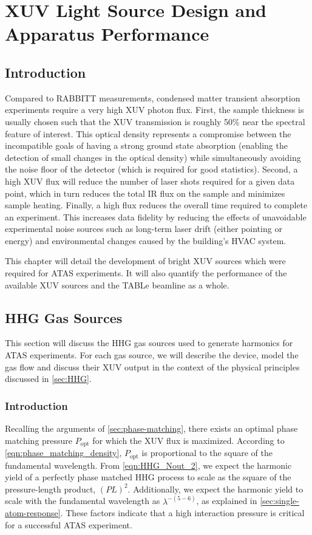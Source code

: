 \chapter{XUV Light Source Design and Apparatus Performance}

\section{Introduction}

Compared to RABBITT measurements, condensed matter transient absorption experiments require a very high XUV photon flux. First, the sample thickness is usually chosen such that the XUV transmission is roughly 50\% near the spectral feature of interest. This optical density represents a compromise between the incompatible goals of having a strong ground state absorption (enabling the detection of small changes in the optical density) while simultaneously avoiding the noise floor of the detector (which is required for good statistics). Second, a high XUV flux will reduce the number of laser shots required for a given data point, which in turn reduces the total IR flux on the sample and minimizes sample heating. Finally, a high flux reduces the overall time required to complete an experiment. This increases data fidelity by reducing the effects of unavoidable experimental noise sources such as long-term laser drift (either pointing or energy) and environmental changes caused by the building's HVAC system.

This chapter will detail the development of bright XUV sources which were required for ATAS experiments. It will also quantify the performance of the available XUV sources and the TABLe beamline as a whole.

\section{HHG Gas Sources}
\label{sec:HHG_gas_sources}

This section will discuss the HHG gas sources used to generate harmonics for ATAS experiments. For each gas source, we will describe the device, model the gas flow and discuss their XUV output in the context of the physical principles discussed in \cref{sec:HHG}.

\subsection{Introduction}

Recalling the arguments of \cref{sec:phase-matching}, there exists an optimal phase matching pressure $P_{\textrm{opt}}$ for which the XUV flux is maximized. According to \cref{eqn:phase_matching_density}, $P_{\textrm{opt}}$ is proportional to the square of the fundamental wavelength. From \cref{eqn:HHG_Nout_2}, we expect the harmonic yield of a perfectly phase matched HHG process to scale as the square of the pressure-length product, $(PL)^2$. Additionally, we expect the harmonic yield to scale with the fundamental wavelength as $\lambda^{-(5-6)}$, as explained in \cref{sec:single-atom-response}. These factors indicate that a high interaction pressure is critical for a successful ATAS experiment.

